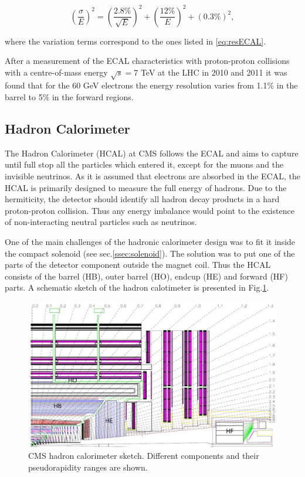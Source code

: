 \begin{equation}\label{eq:resECAL}
  (\frac{\sigma}{E})^{2} = (\frac{2.8\%}{\sqrt{E}})^{2} + (\frac{12\%}{E})^{2} + (0.3\%)^{2},
\end{equation}

where the variation terms correspond to the ones listed in \ref{eq:resECAL}.

After a measurement of the ECAL characteristics with proton-proton collisions with a centre-of-mass energy $\sqrt{s} = $7 TeV
at the LHC in 2010 and 2011 it was found that for the 60 GeV electrons the energy resolution varies from 1.1$\%$ in the barrel 
to 5$\%$ in the forward regions\cite{ECALres2013}.

\subsection{Hadron Calorimeter}

The Hadron Calorimeter (HCAL)\cite{CMSatLHC} at CMS follows the ECAL and aims to capture until full stop all the particles which entered it, 
except for the muons and the invisible neutrinos. As it is assumed that electrons are absorbed in the ECAL, the HCAL is primarily designed 
to measure the full energy of hadrons. Due to the hermiticity, the detector should identify all hadron decay products in a hard proton-proton
collision. Thus any energy imbalance would point to the existence of non-interacting neutral particles such as neutrinos.

One of the main challenges of the hadronic calorimeter design was to fit it inside the compact solenoid (see sec.\ref{ssec:solenoid}).
The solution was to put one of the parts of the detector component outside the magnet coil. Thus the HCAL consists of the barrel (HB), 
outer barrel (HO), endcup (HE) and forward (HF) parts. A schematic sketch of the hadron calotimeter is presented in Fig.\ref{fig:hcal}.

\begin{figure}[t]
  \centering
  \includegraphics[width=1.0\textwidth]{02_experimental_setup/plots/Figures_Experimental_Apparatus_HCAL.png}
  \caption{CMS hadron calorimeter sketch. Different components and their pseudorapidity ranges are shown.}
  \label{fig:hcal}
\end{figure}

